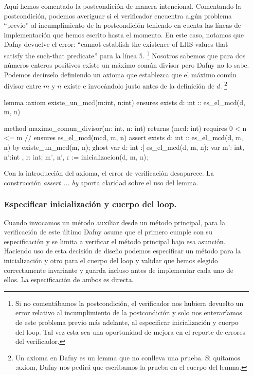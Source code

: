 \documentclass[12pt, a4paper, openany, fleqn]{book}
\begin{document}
    Aquí hemos comentado la postcondición de manera intencional. Comentando la postcondición, podemos averiguar si el verificador encuentra algún problema ``previo'' al incumplimiento de la postcondición teniendo en cuenta las líneas de implementación que hemos escrito hasta el momento.
    En este caso, notamos que Dafny devuelve el error: ``cannot establish the existence of LHS values that satisfy the such-that predicate'' para la línea 5. \footnote{Si no comentábamos la postcondición, el verificador nos hubiera devuelto un error relativo al incumplimiento de la postcondición y solo nos enteraríamos de este problema previo más adelante, al especificar inicialización y cuerpo del loop. Tal vez esta sea una oportunidad de mejora en el reporte de errores del verificador.}
    Nosotros sabemos que para dos números enteros positivos existe un máximo común divisor pero Dafny no lo sabe. Podemos decírselo definiendo un axioma que establezca que el máximo común divisor entre $m$ y $n$ existe e invocándolo justo antes de la definición de $d$. \footnote{Un axioma en Dafny es un lemma que no conlleva una prueba. Si quitamos :axiom, Dafny nos pedirá que escribamos la prueba en el cuerpo del lemma.}

    \begin{dafny}
lemma {:axiom} existe_un_mcd(m:int, n:int)
    ensures exists d: int :: es_el_mcd(d, m, n)

method maximo_comun_divisor(m: int, n: int) returns (mcd: int)
    requires 0 < n <= m
    // ensures es_el_mcd(mcd, m, n)
{
    assert exists d: int :: es_el_mcd(d, m, n) by {
        existe_un_mcd(m, n);
    }
    ghost var d: int :| es_el_mcd(d, m, n);
    var m': int, n':int , r: int;
    m', n', r := inicializacion(d, m, n);
}
    \end{dafny}

    Con la introducción del axioma, el error de verificación desaparece. La construcción \textit{assert ... by} aporta claridad sobre el uso del lemma.

    \subsubsection*{Especificar inicialización y cuerpo del loop.}

    Cuando invocamos un método auxiliar desde un método principal, para la verificación de este último Dafny asume que el primero cumple con su especificación y se limita a verificar el método principal bajo esa asunción. Haciendo uso de esta decisión de diseño podemos especificar un método para la inicialización y otro para el cuerpo del loop y validar que hemos elegido correctamente invariante y guarda incluso antes de implementar cada uno de ellos. La especificación de ambos es directa.
\end{document}

